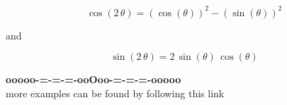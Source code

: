 \documentclass{ximera}
\begin{document}
\[ \cos(2 \, \theta) =  (\cos(\theta))^2 - (\sin(\theta))^2  \]

and

\[ \sin(2 \, \theta) =  2 \, \sin(\theta) \,  \cos(\theta) \]








\begin{center}
\textbf{\textcolor{green!50!black}{ooooo-=-=-=-ooOoo-=-=-=-ooooo}} \\

more examples can be found by following this link\\ 

\end{center}
\end{document}
